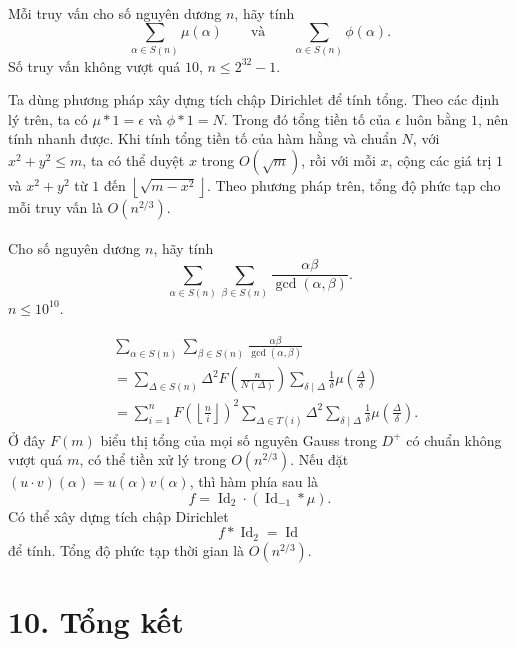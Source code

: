 \documentclass[11pt]{article}
\begin{document}
\paragraph{}
Mỗi truy vấn cho số nguyên dương \(n\), hãy tính
\[
  \sum_{\alpha\in S(n)}\mu(\alpha)\qquad\text{và}\qquad
  \sum_{\alpha\in S(n)}\phi(\alpha).
\]
Số truy vấn không vượt quá \(10\), \(n\le2^{32}-1\).

Ta dùng phương pháp xây dựng tích chập Dirichlet để tính tổng. Theo các định
lý trên, ta có \(\mu*1=\epsilon\) và \(\phi*1=N\). Trong đó tổng tiền tố của
\(\epsilon\) luôn bằng \(1\), nên tính nhanh được. Khi tính tổng tiền tố của
hàm hằng và chuẩn \(N\), với \(x^2+y^2\le m\), ta có thể duyệt \(x\) trong
\(O(\sqrt m)\), rồi với mỗi \(x\), cộng các giá trị \(1\) và \(x^2+y^2\) từ
\(1\) đến \(\left\lfloor\sqrt{m-x^2}\right\rfloor\). Theo phương pháp trên,
tổng độ phức tạp cho mỗi truy vấn là \(O(n^{2/3})\).

\paragraph{}
Cho số nguyên dương \(n\), hãy tính
\[
  \sum_{\alpha\in S(n)}\sum_{\beta\in S(n)}
  \frac{\alpha\beta}{\gcd(\alpha,\beta)}.
\]
\(n\le10^{10}\).

\[
\begin{aligned}
&\sum_{\alpha\in S(n)}\sum_{\beta\in S(n)}
  \frac{\alpha\beta}{\gcd(\alpha,\beta)}\\
&=\sum_{\Delta\in S(n)}\Delta^2
  F\!\left(\frac n{N(\Delta)}\right)
  \sum_{\delta\mid\Delta}\frac1\delta
  \mu\!\left(\frac{\Delta}{\delta}\right)\\
&=\sum_{i=1}^n F\!\left(\left\lfloor\frac ni\right\rfloor\right)^2
  \sum_{\Delta\in T(i)}\Delta^2
  \sum_{\delta\mid\Delta}\frac1\delta
  \mu\!\left(\frac{\Delta}{\delta}\right).
\end{aligned}
\]
Ở đây \(F(m)\) biểu thị tổng của mọi số nguyên Gauss trong \(D^+\) có chuẩn
không vượt quá \(m\), có thể tiền xử lý trong \(O(n^{2/3})\). Nếu đặt
\((u\cdot v)(\alpha)=u(\alpha)v(\alpha)\), thì hàm phía sau là
\[
  f=\operatorname{Id}_2\cdot(\operatorname{Id}_{-1}*\mu).
\]
Có thể xây dựng tích chập Dirichlet
\[
  f*\operatorname{Id}_2=\operatorname{Id}
\]
để tính. Tổng độ phức tạp thời gian là \(O(n^{2/3})\).

\section*{10. Tổng kết}
\end{document}
